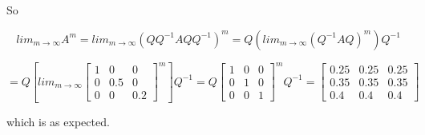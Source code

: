 \documentclass{amsart}
\theoremstyle{definition}
\theoremstyle{remark}
\numberwithin{equation}{section}
\begin{document}
So 

\[  
lim_{m \to \infty}A^m =
lim_{m \to \infty}(QQ^{-1}AQQ^{-1})^m = 
Q(lim_{m \to \infty}(Q^{-1}AQ)^m)Q^{-1} \]

\[
= Q \left[ lim_{m \to \infty} 
\begin{bmatrix}
   1 & 0 & 0  \\
   0 & 0.5 & 0 \\
   0 & 0 & 0.2
 \end{bmatrix}^m \right] Q^{-1}
 =
Q 
\begin{bmatrix}
   1 & 0 & 0  \\
   0 & 1 & 0 \\
   0 & 0 & 1
 \end{bmatrix}^m Q^{-1}
 =
 \begin{bmatrix}{}
0.25 & 0.25 & 0.25 \\
0.35 & 0.35 & 0.35\\
0.4 & 0.4 & 0.4
\end{bmatrix}
\]

which is as expected.



 
\end{document}
